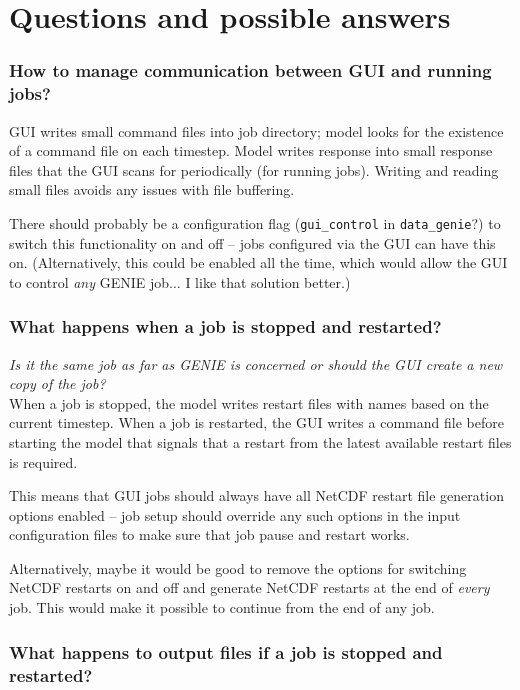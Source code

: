 \documentclass[a4paper,11pt,article]{memoir}
\begin{document}
\section{Questions and possible answers}

\subsubsection*{How to manage communication between GUI and running jobs?}

GUI writes small command files into job directory; model looks for the
existence of a command file on each timestep.  Model writes response
into small response files that the GUI scans for periodically (for
running jobs).  Writing and reading small files avoids any issues with
file buffering.

There should probably be a configuration flag (\texttt{gui\_control}
in \texttt{data\_genie}?) to switch this functionality on and off --
jobs configured via the GUI can have this on.  (Alternatively, this
could be enabled all the time, which would allow the GUI to control
\emph{any} GENIE job...  I like that solution better.)

\subsubsection*{What happens when a job is stopped and restarted?}

\emph{Is it the same job as far as GENIE is concerned or should the
  GUI create a new copy of the job?} \\

When a job is stopped, the model writes restart files with names based
on the current timestep.  When a job is restarted, the GUI writes a
command file before starting the model that signals that a restart
from the latest available restart files is required.

This means that GUI jobs should always have all NetCDF restart file
generation options enabled -- job setup should override any such
options in the input configuration files to make sure that job pause
and restart works.

Alternatively, maybe it would be good to remove the options for
switching NetCDF restarts on and off and generate NetCDF restarts at
the end of \emph{every} job.  This would make it possible to continue
from the end of any job.

\subsubsection*{What happens to output files if a job is stopped and
  restarted?}
\end{document}

